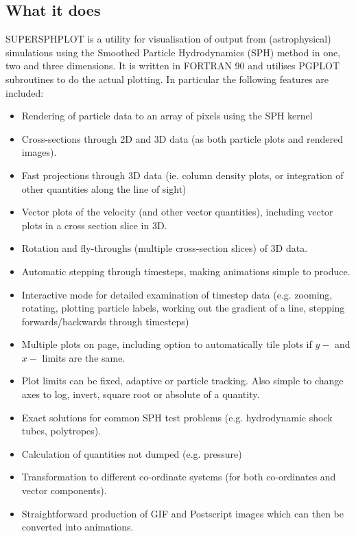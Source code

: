 \documentclass[a4paper,12pt]{article}
\begin{document}
\subsection{What it does}
SUPERSPHPLOT is a utility for visualisation of output from (astrophysical) simulations using the
Smoothed Particle Hydrodynamics (SPH) method in one, two and three dimensions.
It is written in FORTRAN 90 and
utilises PGPLOT subroutines to do the actual plotting. In particular the following
features are included:
\begin{itemize}
\item Rendering of particle data to an array of pixels using the SPH kernel
\item Cross-sections through 2D and 3D data (as both particle plots and rendered
images).
\item Fast projections through 3D data (ie. column density plots, or integration of
other quantities along the line of sight)
\item Vector plots of the velocity (and other vector quantities), including vector
plots in a cross section slice in 3D.
\item Rotation and fly-throughs (multiple cross-section slices) of 3D data.
\item Automatic stepping through timesteps, making animations simple to produce.
\item Interactive mode for detailed examination of timestep data (e.g. zooming,
rotating, plotting particle labels, working out the gradient of a line, stepping forwards/backwards
through timesteps)
\item Multiple plots on page, including option to automatically tile plots if $y-$ and $x-$ limits
are the same.
\item Plot limits can be fixed, adaptive or particle tracking. Also simple to change
axes to log, invert, square root or absolute of a quantity.
\item Exact solutions for common SPH test problems (e.g. hydrodynamic shock tubes,
polytropes).
\item Calculation of quantities not dumped (e.g. pressure)
\item Transformation to different co-ordinate systems (for both co-ordinates and
vector components).
\item Straightforward production of GIF and Postscript images which can then be
converted into animations.
\end{itemize}
\end{document}
